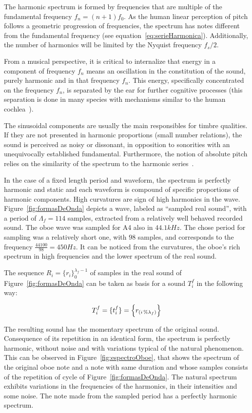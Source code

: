 \documentclass[
 aip,
 jmp,
 amsmath,amssymb,
 reprint,
]{revtex4-1}
\begin{document}
The harmonic spectrum is formed by frequencies that are multiple of the fundamental frequency $f_n=(n+1)f_0$. As the human linear perception of pitch follows  a geometric progression of frequencies, the spectrum has notes different from the fundamental frequency (see equation~\ref{eq:serieHarmonica}). Additionally, the number of harmonics will be limited by the Nyquist frequency $f_s/2$.

From a musical perspective, it is critical to internalize that energy in a component of frequency $f_n$ means an oscillation in the constitution of the sound, purely harmonic and in that frequency $f_n$. This energy, specifically concentrated on the frequency $f_n$, is separated by the ear for further cognitive processes (this separation is done in many species with mechanisms similar to the human cochlea~\cite{Roederer}).

The sinusoidal components are usually the main responsibles for timbre qualities. If they are not presented in harmonic proportions (small number relations), the sound is perceived as noisy or dissonant, in opposition to sonorities with an unequivocally established fundamental. Furthermore, the notion of absolute pitch relies on the similarity of the spectrum to the harmonic series~\cite{Roederer}. 

In the case of a fixed length period and waveform, the spectrum is perfectly harmonic and static and  each waveform is compound of specific proportions of harmonic components. High  curvatures are sign of high harmonics in the wave. Figure~\ref{fig:formasDeOnda} depicts a wave, labeled as ``sampled real sound'', with a period of $\Lambda_f=114$ samples, extracted from a relatively well behaved recorded sound. The oboe wave was sampled for A4 also in $44.1kHz$. The chose period for sampling was a relatively short one, with $98$ samples, and corresponds to the frequency $\frac{44100}{98}=450Hz$. It can be noticed from the curvatures, the oboe's rich spectrum in high frequencies and the lower spectrum of the real sound.

The sequence 
$ R_i=\{ r_i \}_0^{\lambda_f-1}$ of samples in the real sound of Figure~\ref{fig:formasDeOnda} can be taken as basis for a sound $T_i^f$ in the following way: 

\begin{equation}\label{sampleandoFormaDeOnda}
     T^f_i=\{ t_i^f \}=\Bigl\{ r_{(i\,\%\lambda_{f})} \Bigr\}
\end{equation}

The resulting sound has the momentary spectrum of the original sound. Consequence of its repetition in an identical form, the spectrum is perfectly harmonic, without noise and with variations typical of the natural phenomenon. This can be observed in Figure~\ref{fig:espectroOboe}, that shows the spectrum of the original oboe note and a note with same duration and whose samples consists of the repetition of cycle of Figure~\ref{fig:formasDeOnda}. The natural spectrum exhibits variations in the frequencies of the harmonics, in their intensities and some noise. The note made from the sampled period has a perfectly harmonic spectrum.
\end{document}
